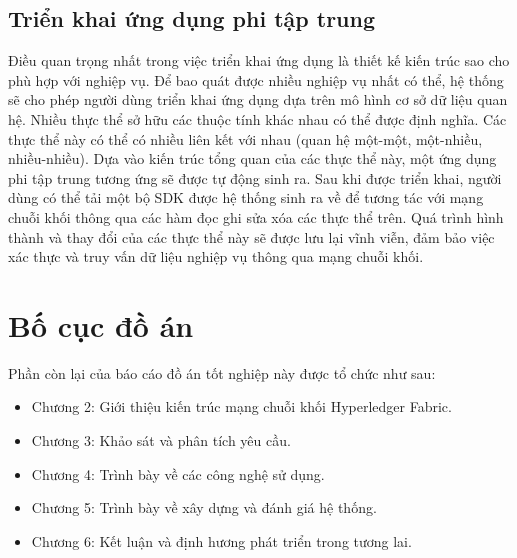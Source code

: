 \documentclass[../DoAn.tex]{subfiles}
\begin{document}
\subsection{Triển khai ứng dụng phi tập trung}
Điều quan trọng nhất trong việc triển khai ứng dụng là thiết kế kiến trúc sao cho phù hợp với nghiệp vụ. Để bao quát được nhiều nghiệp vụ nhất có thể, hệ thống sẽ cho phép người dùng triển khai ứng dụng dựa trên mô hình cơ sở dữ liệu quan hệ. Nhiều thực thể sở hữu các thuộc tính khác nhau có thể được định nghĩa. Các thực thể này có thể có nhiều liên kết với nhau (quan hệ một-một, một-nhiều, nhiều-nhiều). Dựa vào kiến trúc tổng quan của các thực thể này, một ứng dụng phi tập trung tương ứng sẽ được tự động sinh ra. Sau khi được triển khai, người dùng có thể tải một bộ SDK được hệ thống sinh ra về để tương tác với mạng chuỗi khối thông qua các hàm đọc ghi sửa xóa các thực thể trên. Quá trình hình thành và thay đổi của các thực thể này sẽ được lưu lại vĩnh viễn, đảm bảo việc xác thực và truy vấn dữ liệu nghiệp vụ thông qua mạng chuỗi khối.

\section{Bố cục đồ án}
\label{section:1.4}
Phần còn lại của báo cáo đồ án tốt nghiệp này được tổ chức như sau:

\begin{itemize}
	\item Chương 2: Giới thiệu kiến trúc mạng chuỗi khối Hyperledger Fabric.
	\item Chương 3: Khảo sát và phân tích yêu cầu.
	\item Chương 4: Trình bày về các công nghệ sử dụng.
	\item Chương 5: Trình bày về xây dựng và đánh giá hệ thống.
	\item Chương 6: Kết luận và định hương phát triển trong tương lai.
\end{itemize}




\end{document}
